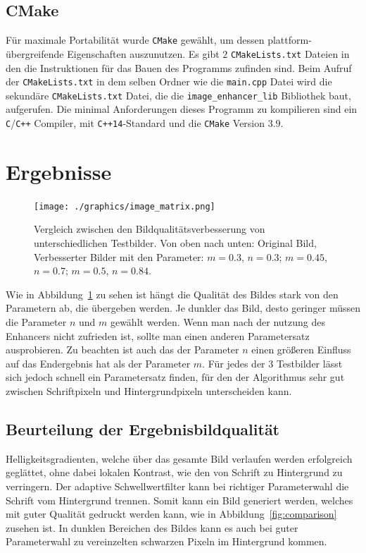 \documentclass[sigconf]{acmart}
\begin{document}
\subsection{CMake}
Für maximale Portabilität wurde \texttt{CMake} gewählt, um dessen
plattform-übergreifende Eigenschaften auszunutzen. Es gibt $2$
\texttt{CMakeLists.txt} Dateien in den die Instruktionen für das Bauen
des Programms zufinden sind. Beim Aufruf der \texttt{CMakeLists.txt}
in dem selben Ordner wie die \texttt{main.cpp} Datei wird die sekundäre
\texttt{CMakeLists.txt} Datei, die die \texttt{image\_enhancer\_lib} Bibliothek
baut, aufgerufen.  Die minimal Anforderungen dieses Programm zu
kompilieren sind ein \texttt{C}/\texttt{C++} Compiler, mit
\texttt{C++14}-Standard und die \texttt{CMake} Version $3.9$.

\section{Ergebnisse}
\begin{figure}[htbp]
  \centering
  \texttt{[image: ./graphics/image\_matrix.png]}
  \caption{Vergleich zwischen den Bildqualitätsverbesserung von unterschiedlichen
           Testbilder. Von oben nach unten: Original Bild, Verbesserter Bilder mit den
           Parameter: $m=0.3$, $n=0.3$; $m=0.45$, $n=0.7$; $m = 0.5$, $n = 0.84$.}
  \label{fig:image_matrix}
\end{figure}

Wie in Abbildung~\ref{fig:image_matrix} zu sehen ist hängt die Qualität des Bildes stark
von den Parametern ab, die übergeben werden. Je dunkler das Bild,
desto geringer müssen die Parameter $n$ und $m$ gewählt werden. Wenn man
nach der nutzung des Enhancers nicht zufrieden ist, sollte man einen
anderen Parametersatz ausprobieren.  Zu beachten ist auch das der
Parameter $n$ einen größeren Einfluss auf das Endergebnis hat als der
Parameter $m$.  Für jedes der $3$ Testbilder lässt sich jedoch schnell ein
Parametersatz finden, für den der Algorithmus sehr gut zwischen
Schriftpixeln und Hintergrundpixeln unterscheiden kann.

\subsection{Beurteilung der Ergebnisbildqualität}
Helligkeitsgradienten, welche über das gesamte Bild verlaufen werden
erfolgreich geglättet, ohne dabei lokalen Kontrast, wie den von Schrift zu
Hintergrund zu verringern.  Der adaptive Schwellwertfilter kann bei richtiger
Parameterwahl die Schrift vom Hintergrund trennen. Somit kann ein Bild
generiert werden, welches mit guter Qualität gedruckt werden kann, wie in
Abbildung~\ref{fig:comparison} zusehen ist. In
dunklen Bereichen des Bildes kann es auch bei guter Parameterwahl zu
vereinzelten schwarzen Pixeln im Hintergrund kommen.
\end{document}
